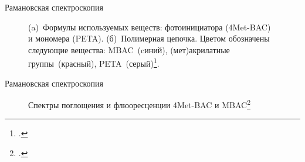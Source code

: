 \documentclass[aspectratio=169]{beamer}
\begin{document}
\begin{frame}{Рамановская спектроскопия}
\begin{figure}
\begin{minipage}{0.45\linewidth}
            \end{minipage}
            \caption*{(a)~Формулы используемых веществ: фотоинициатора (4Met-BAC) и мономера (PETA). (б)~Полимерная цепочка. Цветом обозначены следующие вещества: MBAC~(cиний), (мет)акрилатные группы~(красный), PETA~(серый)\footcite{4metbac}.}
        \end{figure}
\end{frame}

\begin{frame}{Рамановская спектроскопия}
        \begin{figure}
            \caption*{Спектры поглощения и флюоресценции 4Met-BAC и MBAC\footcite{4metbac}}
        \end{figure}
\end{frame}
\end{document}
